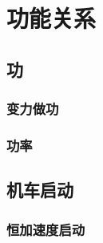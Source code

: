 \documentclass[cn,blue,11pt,normal]{elegantnote}
\begin{document}

\newpage
\section{功能关系}
\subsection{功}
\begin{proset}
	
\end{proset}
\begin{proset}
	
\end{proset}
\subsubsection{变力做功}
\begin{proset}
	
\end{proset}
\begin{proset}
	
\end{proset}
\begin{proset}
	
\end{proset}
\subsubsection{功率}

\subsection{机车启动}
\begin{proset}
	
\end{proset}
\begin{proset}
	
\end{proset}
\subsubsection{恒加速度启动}
\begin{proset}
	
\end{proset}
\begin{proset}
	
\end{proset}
\begin{proset}
	
\end{proset}
\end{document}

